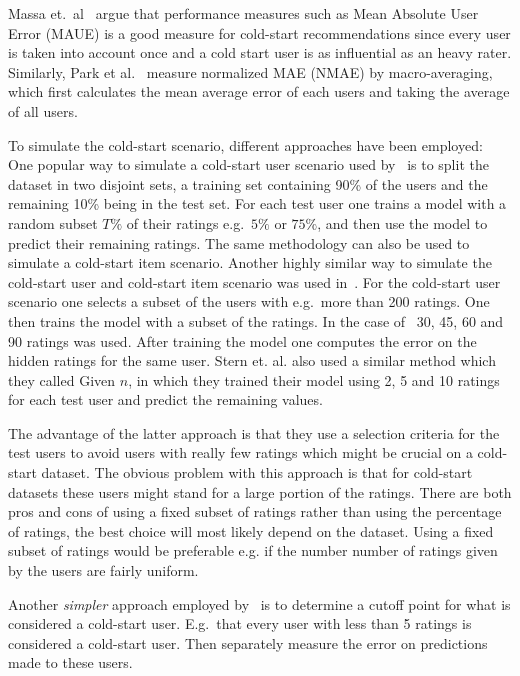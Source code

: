 Massa et.\ al~\cite{Massa2004} argue that performance measures such as Mean
Absolute User Error (MAUE) is a good measure for cold-start recommendations
since every user is taken into account once and a cold start user is as
influential as an heavy rater. Similarly, Park et al.~\cite{Park2006} measure
normalized MAE (NMAE) by macro-averaging, which first calculates the mean
average error of each users and taking the average of all users.

To simulate the cold-start scenario, different approaches have been employed:
One popular way to simulate a cold-start user scenario used by~\cite{Stern2009,
Lam2008} is to split the dataset in two disjoint sets, a training set
containing 90\% of the users and the remaining 10\% being in the test set. For
each test user one trains a model with a random subset $T\%$ of their ratings
e.g.\ $5\%$ or $75\%$, and then use the model to predict their remaining
ratings. The same methodology can also be used to simulate a cold-start item
scenario. Another highly similar way to simulate the cold-start user and
cold-start item scenario was used in~\cite{Rashid2002, Rashid2008}. For the
cold-start user scenario one selects a subset of the users with e.g.\ more than
200 ratings. One then trains the model with a subset of the ratings. In the
case of~\cite{Rashid2002} 30, 45, 60 and 90 ratings was used. After training
the model one computes the error on the hidden ratings for the same user.
Stern et. al. \cite{Stern1998} also used a similar method which they called
Given $n$, in which they trained their model using 2, 5 and 10 ratings for each
test user and predict the remaining values.

The advantage of the latter approach is that they use a selection criteria for
the test users to avoid users with really few ratings which might be crucial on
a cold-start dataset.  The obvious problem with this approach is that for
cold-start datasets these users might stand for a large portion of the ratings.
There are both pros and cons of using a fixed subset of ratings rather than
using the percentage of ratings, the best choice will most likely depend on the
dataset. Using a fixed subset of ratings would be preferable e.g. if the number
number of ratings given by the users are fairly uniform.

Another \emph{simpler} approach employed by~\cite{Massa2007, Jamali2009} is to
determine a cutoff point for what is considered a cold-start user. E.g.\ that
every user with less than 5 ratings is considered a cold-start user. Then
separately measure the error on predictions made to these users.

